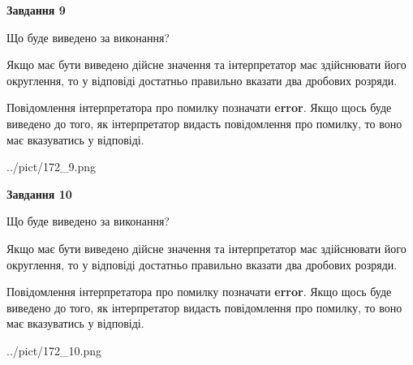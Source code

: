 \documentclass[12pt, ukrainian]{article}
\begin{document}
{\begin {Large}
{\begin {center}\textbf{Завдання 9}\end {center}}\par
Що буде виведено за виконання? \par

Якщо має бути виведено дійсне значення та інтерпретатор має здійснювати його округлення, 
то у відповіді достатньо правильно вказати два дробових розряди.

Повідомлення інтерпретатора про помилку позначати \textbf{error}.
Якщо щось буде виведено до того, як інтерпретатор видасть повідомлення про помилку, 
то воно має вказуватись у відповіді. \par

\begin{center}
	{../pict/172_9.png}
\end{center}
\newpage

{\begin {center}\textbf{Завдання 10}\end {center}}\par
Що буде виведено за виконання? \par

Якщо має бути виведено дійсне значення та інтерпретатор має здійснювати його округлення, 
то у відповіді достатньо правильно вказати два дробових розряди.

Повідомлення інтерпретатора про помилку позначати \textbf{error}.
Якщо щось буде виведено до того, як інтерпретатор видасть повідомлення про помилку, 
то воно має вказуватись у відповіді. \par

\begin{center}
	{../pict/172_10.png}
\end{center}
\newpage

\end {Large}}
\end{document}
